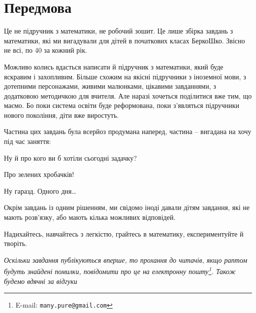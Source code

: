 \chapter*{Передмова}

Це не підручник з математики, не робочий зошит.
Це лише збірка завдань з математики, які ми вигадували для дітей
в початкових класах БеркоШко.
Звісно не всі, по 40 за кожний рік.

Можливо колись вдасться написати й підручник з математики,
який буде яскравим і захопливим.
Більше схожим на якісні підручники з іноземної мови, з дотепними персонажами,
живими малюнками, цікавими завданнями, з додатковою методичкою для вчителя.
Але наразі хочеться поділитися вже тим, що маємо.
Бо поки система освіти буде реформована, поки з’являться підручники
нового покоління, діти вже виростуть.

Частина цих завдань була всерйоз продумана наперед,
частина – вигадана на хочу під час заняття:
\begin{dialogue}
\item Ну й про кого ви б хотіли сьогодні задачку?
\item Про зелених хробачків!
\item Ну гаразд. Одного дня\ldots
\end{dialogue}

Окрім завдань із одним рішенням, ми свідомо іноді давали дітям завдання,
які не мають розв’язку, або мають кілька можливих відповідей.

Надихайтесь, навчайтесь з легкістю, грайтесь в математику,
експериментуйте й творіть. \smiley

\medskip

{ \emph{Оскільки завдання публікуються вперше, то прохання до читачів,
якщо раптом будуть знайдені помилки,
повідомити про це на електронну пошту\footnote{
    E-mail: \texttt{many.pure@gmail.com}
}.
Також будемо вдячні за відгуки}} \smiley
